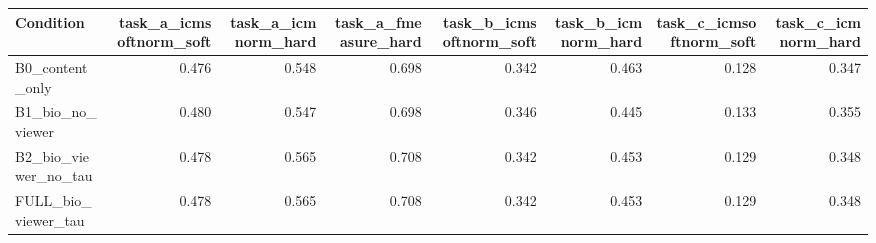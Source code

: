 \begin{tabular}{lrrrrrrr}
\toprule
Condition & task\_a\_icmsoftnorm\_soft & task\_a\_icmnorm\_hard & task\_a\_fmeasure\_hard & task\_b\_icmsoftnorm\_soft & task\_b\_icmnorm\_hard & task\_c\_icmsoftnorm\_soft & task\_c\_icmnorm\_hard \\
\midrule
B0\_content\_only & 0.476 & 0.548 & 0.698 & 0.342 & 0.463 & 0.128 & 0.347 \\
B1\_bio\_no\_viewer & 0.480 & 0.547 & 0.698 & 0.346 & 0.445 & 0.133 & 0.355 \\
B2\_bio\_viewer\_no\_tau & 0.478 & 0.565 & 0.708 & 0.342 & 0.453 & 0.129 & 0.348 \\
FULL\_bio\_viewer\_tau & 0.478 & 0.565 & 0.708 & 0.342 & 0.453 & 0.129 & 0.348 \\
\bottomrule
\end{tabular}
